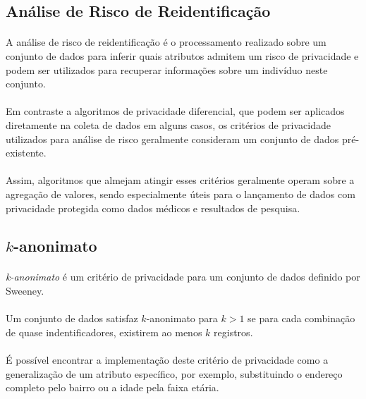 \subsection{Análise de Risco de Reidentificação}

\paragraph{} A análise de risco de reidentificação é o processamento realizado sobre um conjunto de dados para inferir quais atributos admitem um risco de privacidade e podem ser utilizados para recuperar informações sobre um indivíduo neste conjunto.

\paragraph{} Em contraste a algoritmos de privacidade diferencial, que podem ser aplicados diretamente na coleta de dados em alguns casos, os critérios de privacidade utilizados para análise de risco geralmente consideram um conjunto de dados pré-existente. 

\paragraph{} Assim, algoritmos que almejam atingir esses critérios geralmente operam sobre a agregação de valores, sendo especialmente úteis para o lançamento de dados com privacidade protegida como dados médicos e resultados de pesquisa.

\subsection{$k$-anonimato}

\paragraph{} \textit{k-anonimato} é um critério de privacidade para um conjunto de dados definido por Sweeney\cite{sweeney2002kanon}. 

\paragraph{} Um conjunto de dados satisfaz $k$-anonimato para $k > 1$ se para cada combinação de quase indentificadores, existirem ao menos $k$ registros\cite{domingo2008critique}.

\paragraph{} É possível encontrar a implementação deste critério de privacidade como a generalização de um atributo específico, por exemplo, substituindo o endereço completo pelo bairro ou a idade pela faixa etária.

